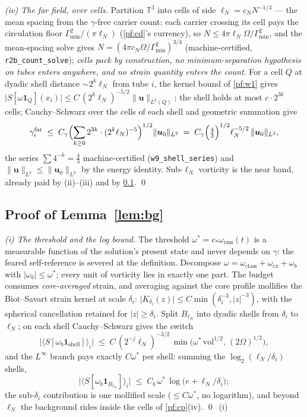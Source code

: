 \documentclass[11pt,letterpaper]{amsart}
\theoremstyle{definition}
\theoremstyle{remark}
\newcommand{\TT}{\mathbb{T}}
\newcommand{\om}{\omega}
\newcommand{\uu}{\boldsymbol{u}}
\newcommand{\norm}[1]{\lVert #1 \rVert}
\newcommand{\abs}[1]{\lvert #1 \rvert}
\begin{document}
\emph{(iv) The far field, over cells.} Partition $\TT^3$ into cells of side
$\ell_N=c_NN^{-1/3}$ --- the mean spacing from the $\gamma$-free carrier count:
each carrier crossing its cell pays the circulation floor
$\Gamma_{\min}^2/(\pi\ell_N)$ (\cref{pf:cd}'s currency), so
$N\le4\pi\ell_N\Omega/\Gamma_{\min}^2$, and the mean-spacing solve gives
$N=(4\pi c_N\Omega/\Gamma_{\min}^2)^{3/4}$ (machine-certified,
\texttt{r2b\_count\_solve}); \emph{cells pack by construction, no
minimum-separation hypothesis on tubes enters anywhere, and no strain
quantity enters the count}. For a cell $Q$ at dyadic shell distance
$\sim2^k\ell_N$ from tube $i$, the kernel bound of \cref{pf:w1} gives
$\abs{S[\om\mathbf{1}_Q](x_i)}\le C\,(2^k\ell_N)^{-5/2}\norm{\uu}_{L^2(Q)}$;
the shell holds at most $c\cdot2^{3k}$ cells; Cauchy--Schwarz over the cells of each
shell and geometric summation give
\[
\gamma_i^{\mathrm{far}}
\;\le\;C_\gamma\Bigl(\sum_{k\ge0}2^{3k}\cdot(2^k\ell_N)^{-5}\Bigr)^{1/2}
\norm{\uu_0}_{L^2}
\;=\;C_\gamma\Bigl(\tfrac{4}{3}\Bigr)^{1/2}\ell_N^{-5/2}\,\norm{\uu_0}_{L^2},
\]
the series $\sum4^{-k}=\tfrac43$ machine-certified (\texttt{w9\_shell\_series}) and
$\norm{\uu}_{L^2}\le\norm{\uu_0}_{L^2}$ by the energy identity. Sub-$\ell_N$
vorticity is the near band, already paid by (ii)--(iii) and by
\cref{pf:bg}. \qed

\subsection{Proof of Lemma~\ref{lem:bg}}\label{pf:bg}
\emph{(i) The threshold and the log bound.} The threshold
$\om^*=c_*\om_{\mathrm{rms}}(t)$ is a measurable function of the solution's present
state and never depends on $\gamma$: the feared self-reference is severed at the
definition. Decompose $\om=\om_{\mathrm{class}}+\om_{\mathrm{cx}}+\om_b$ with
$\abs{\om_b}\le\om^*$; every unit of vorticity lies in exactly one part. The budget
consumes \emph{core-averaged} strain, and averaging against the core profile
mollifies the Biot--Savart strain kernel at scale $\delta_i$:
$\abs{K_{\delta_i}(z)}\le C\min(\delta_i^{-3},\abs{z}^{-3})$, with the spherical
cancellation retained for $\abs{z}\ge\delta_i$. Split $B_{\ell_N}$ into dyadic
shells from $\delta_i$ to $\ell_N$; on each shell Cauchy--Schwarz gives the switch
\[
\abs{\langle S[\om_b\mathbf{1}_{\mathrm{shell}}]\rangle_i}
\;\le\;C\,(2^{-j}\ell_N)^{-3/2}\,
\min\bigl(\om^*\,\mathrm{vol}^{1/2},\,(2\Omega)^{1/2}\bigr),
\]
and the $L^\infty$ branch pays exactly $C\om^*$ per shell: summing the
$\log_2(\ell_N/\delta_i)$ shells,
\[
\abs{\langle S[\om_b\mathbf{1}_{B_{\ell_N}}]\rangle_i}
\;\le\;C_b\,\om^*\,\log\bigl(e+\ell_N/\delta_i\bigr);
\]
the sub-$\delta_i$ contribution is one mollified scale ($\le C\om^*$, no
logarithm), and beyond $\ell_N$ the background rides inside the cells of
\cref{pf:cp}(iv). \qed\ (i)
\end{document}
